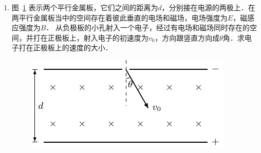 \begin{enumerate}
\item  图~\ref{fig_C_1-48} 表示两个平行金属板，它们之间的距离为$d$，分别接在电源的两极上．在两平行金属板当中的空间存在着彼此垂直的电场和磁场，电场强度为$E$，磁感应强度为$B$． 从负极板的小孔射入一个电子，经过有电场和磁场同时存在的空间，并打在正极板上，射入电子的初速度为$v_0$，方向跟竖直方向成$\theta$角．求电子打在正极板上的速度的大小．

\begin{figure}[htbp]
    \centering
    \includegraphics{fig/C/1-48.pdf}
    \caption{}\label{fig_C_1-48}
\end{figure}
\end{enumerate}

